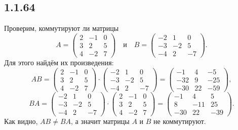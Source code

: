 \subsection{1.1.64}

Проверим, коммутируют ли матрицы
\[
A=
\begin{pmatrix}
	2 & -1 & 0 \\
	3 & 2 & 5 \\
	4 & -2 & 7
\end{pmatrix}
\quad\text{и}\quad B=
\begin{pmatrix}
	-2 & 1 & 0 \\
	-3 & -2 & 5 \\
	-4 & 2 & -7
\end{pmatrix}
.
\]
Для этого найдём их произведения:
\[
AB=
\begin{pmatrix}
	2 & -1 & 0 \\
	3 & 2 & 5 \\
	4 & -2 & 7
\end{pmatrix}
\cdot
\begin{pmatrix}
	-2 & 1 & 0 \\
	-3 & -2 & 5 \\
	-4 & 2 & -7
\end{pmatrix}
=
\begin{pmatrix}
	-1 & 4 & -5 \\
	-32 & 9 & -25 \\
	-30 & 22 & -59
\end{pmatrix}
,
\]
\[
BA=
\begin{pmatrix}
	-2 & 1 & 0 \\
	-3 & -2 & 5 \\
	-4 & 2 & -7
\end{pmatrix}
\cdot
\begin{pmatrix}
	2 & -1 & 0 \\
	3 & 2 & 5 \\
	4 & -2 & 7
\end{pmatrix}
=
\begin{pmatrix}
	-1 & 4 & 5 \\
	8 & -11 & 25 \\
	-30 & 22 & -39
\end{pmatrix}.
\]
Как видно, $AB\neq BA$, а значит матрицы $A$ и $B$ не коммутируют.
